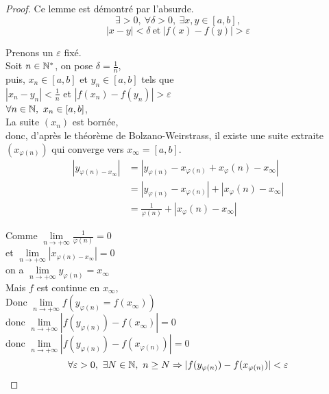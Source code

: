 \documentclass[../main.tex]{subfile}
\begin{document}
\begin{proof}
	Ce lemme est démontré par l'absurde.\\
	$$\exists > 0, \ \forall \delta > 0, \ \exists x, y \in [a, b], $$
	$$|x-y| < \delta \ \text{et} \ |f(x) - f(y)| > \varepsilon$$

	Prenons un $\varepsilon$ fixé.\\
	Soit $n \in \mathbb{N}^*$, on pose $\delta = \frac{1}{n}$, \\
	puis, $x_n \in [a, b]$ et $y_n \in [a, b]$ tels que \\
	$|x_n - y_n| < \frac{1}{n}$ et $|f(x_n) - f(y_n)| > \varepsilon$\\

	$\forall n \in \mathbb{N}, \ x_n \in [a, b]$, \\
	La suite $(x_n)$ est bornée, \\
	donc, d'après le théorème de Bolzano-Weirstrass, il existe une suite extraite $(x_{\varphi(n)})$ qui converge vers $x_\infty = [a, b]$.\\
	$$
	\begin{aligned}
	|y_{\varphi(n) - x_\infty}| &= |y_{\varphi(n)} - x_{\varphi(n)} + x_{\varphi}(n) - x_\infty|\\
	&= |y_{\varphi(n)} - x_{\varphi(n)}| + |x_{\varphi}(n) - x_\infty|\\
	&= \frac{1}{\varphi(n)} + |x_{\varphi}(n) - x_\infty|
	\end{aligned}
	$$

	Comme $\lim\limits_{n \to + \infty} \frac{1}{\varphi(n)} = 0$\\
	et $\lim\limits_{n \to + \infty} |x_{\varphi(n) - x_\infty}| = 0$\\
	on a $\lim\limits_{n \to + \infty} y_{\varphi(n)} = x_\infty$\\

	Mais $f$ est continue en $x_\infty$, \\
	Donc $\lim\limits_{n \to + \infty} f(y_{\varphi(n)} = f(x_\infty))$\\
	donc $\lim\limits_{n \to + \infty} |f(y_{\varphi(n)}) - f(x_{\infty})| = 0$\\
	donc $\lim\limits_{n \to + \infty} |f(y_{\varphi(n)}) - f(x_{\varphi(n)})| = 0$\\
	$$\forall \varepsilon > 0, \ \exists N \in \mathbb{N}, \ n \geq N \Rightarrow |f(y_{\varphi(n)}) - f(x_{\varphi(n)})| < \varepsilon$$
	
\end{proof}
\end{document}
